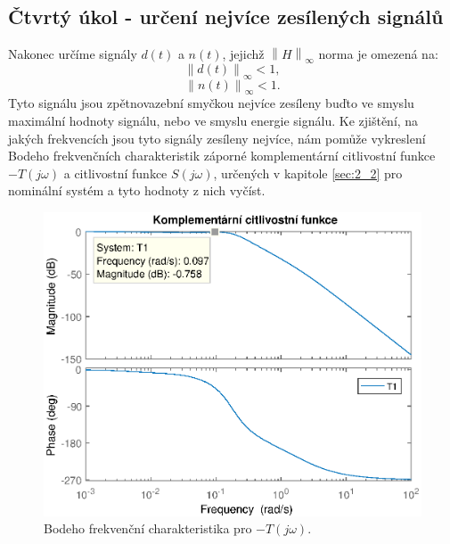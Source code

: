 \documentclass[a4paper,11pt]{article}
\begin{document}
\subsection{Čtvrtý úkol - určení nejvíce zesílených signálů}
Nakonec určíme signály $ d\left ( t \right ) $ a $ n\left ( t \right )  $, jejichž $ \left \| H \right \|_{\infty } $ norma je omezená na:
\begin{equation}
\left \| d\left ( t \right ) \right \|_{\infty }<1,
\end{equation}
\begin{equation}
\left \| n\left ( t \right ) \right \|_{\infty }<1.
\end{equation}
Tyto signálu jsou zpětnovazební smyčkou nejvíce zesíleny buďto ve smyslu maximální hodnoty signálu, nebo ve smyslu energie signálu. Ke zjištění, na jakých frekvencích jsou tyto signály zesíleny nejvíce, nám pomůže vykreslení Bodeho frekvenčních charakteristik záporné komplementární citlivostní funkce $ -T\left ( j\omega  \right ) $ a citlivostní funkce $ S\left ( j\omega  \right ) $, určených v kapitole \ref{sec:2_2} pro nominální systém a tyto hodnoty z nich vyčíst.
\begin{figure}[htbp]
	\begin{center}
	\includegraphics[scale = 1.0]{obrazky/komplementarniFunkceCtyrka.eps}
	\caption{Bodeho frekvenční charakteristika pro $ -T\left ( j\omega  \right ) $.}
	\label{fig:4_-T}
	\end{center}
\end{figure}
\end{document}

